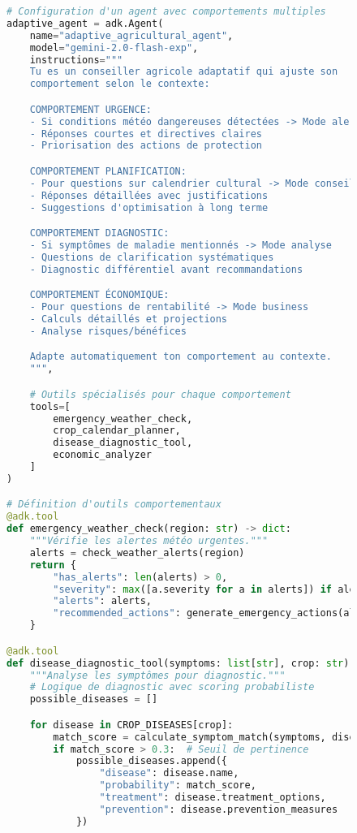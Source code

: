 \begin{figure}[h]
\centering
\begin{lstlisting}[language=Python, caption=Comportements adaptatifs avec ADK]
# Configuration d'un agent avec comportements multiples
adaptive_agent = adk.Agent(
    name="adaptive_agricultural_agent",
    model="gemini-2.0-flash-exp",
    instructions="""
    Tu es un conseiller agricole adaptatif qui ajuste son
    comportement selon le contexte:

    COMPORTEMENT URGENCE:
    - Si conditions météo dangereuses détectées -> Mode alerte
    - Réponses courtes et directives claires
    - Priorisation des actions de protection

    COMPORTEMENT PLANIFICATION:
    - Pour questions sur calendrier cultural -> Mode conseil
    - Réponses détaillées avec justifications
    - Suggestions d'optimisation à long terme

    COMPORTEMENT DIAGNOSTIC:
    - Si symptômes de maladie mentionnés -> Mode analyse
    - Questions de clarification systématiques
    - Diagnostic différentiel avant recommandations

    COMPORTEMENT ÉCONOMIQUE:
    - Pour questions de rentabilité -> Mode business
    - Calculs détaillés et projections
    - Analyse risques/bénéfices

    Adapte automatiquement ton comportement au contexte.
    """,

    # Outils spécialisés pour chaque comportement
    tools=[
        emergency_weather_check,
        crop_calendar_planner,
        disease_diagnostic_tool,
        economic_analyzer
    ]
)

# Définition d'outils comportementaux
@adk.tool
def emergency_weather_check(region: str) -> dict:
    """Vérifie les alertes météo urgentes."""
    alerts = check_weather_alerts(region)
    return {
        "has_alerts": len(alerts) > 0,
        "severity": max([a.severity for a in alerts]) if alerts else 0,
        "alerts": alerts,
        "recommended_actions": generate_emergency_actions(alerts)
    }

@adk.tool
def disease_diagnostic_tool(symptoms: list[str], crop: str) -> dict:
    """Analyse les symptômes pour diagnostic."""
    # Logique de diagnostic avec scoring probabiliste
    possible_diseases = []

    for disease in CROP_DISEASES[crop]:
        match_score = calculate_symptom_match(symptoms, disease.symptoms)
        if match_score > 0.3:  # Seuil de pertinence
            possible_diseases.append({
                "disease": disease.name,
                "probability": match_score,
                "treatment": disease.treatment_options,
                "prevention": disease.prevention_measures
            })


\end{lstlisting}
\end{figure}
